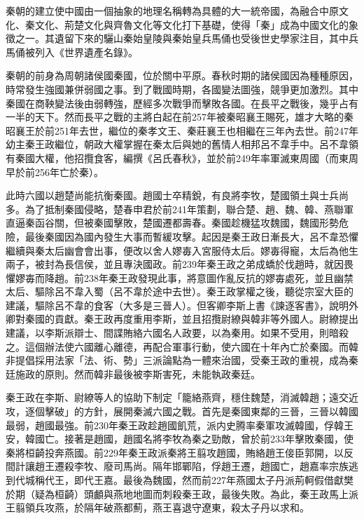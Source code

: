 秦朝的建立使中國由一個抽象的地理名稱轉為具體的大一統帝國，為融合中原文化、秦文化、荊楚文化與齊魯文化等文化打下基礎，使得「秦」成為中國文化的象徵之一。其遺留下來的驪山秦始皇陵與秦始皇兵馬俑也受後世史學家注目，其中兵馬俑被列入《世界遺產名錄》。

秦朝的前身為周朝諸侯國秦國，位於關中平原。春秋时期的諸侯國因為種種原因，時常發生強國兼併弱國之事。到了戰國時期，各國變法圖強，競爭更加激烈。其中秦國在商鞅變法後由弱轉強，歷經多次戰爭而擊敗各國。在長平之戰後，幾乎占有一半的天下。然而長平之戰的主將白起在前257年被秦昭襄王賜死，雄才大略的秦昭襄王於前251年去世，繼位的秦孝文王、秦莊襄王也相繼在三年內去世。前247年幼主秦王政繼位，朝政大權掌握在秦太后與她的舊情人相邦呂不韋手中。呂不韋領有秦國大權，他招攬食客，編撰《呂氏春秋》，並於前249年率軍滅東周國（而東周早於前256年亡於秦）。

此時六國以趙楚尚能抗衡秦國。趙國士卒精銳，有良將李牧，楚國領土與士兵尚多。為了抵制秦國侵略，楚春申君於前241年策劃，聯合楚、趙、魏、韓、燕聯軍直逼秦函谷關，但被秦國擊敗，楚國遷都壽春。秦國趁機猛攻魏國，魏國形勢危險，最後秦國因為國內發生大事而暫緩攻擊。起因是秦王政日漸長大，呂不韋恐懼繼續與秦太后幽會會出事，便改以舍人嫪毐入宮服侍太后。嫪毐得寵，太后為他生兩子，被封為長信侯，並且專決國政。前239年秦王政之弟成蟜於伐趙時，就因畏懼嫪毐而降趙。前238年秦王政發現此事，將意圖作亂反抗的嫪毐處死，並且幽禁太后、驅除呂不韋入蜀（呂不韋於途中去世）。秦王政掌權之後，聽從宗室大臣的建議，驅除呂不韋的食客（大多是三晉人）。但客卿李斯上書《諫逐客書》，說明外卿對秦國的貢獻。秦王政再度重用李斯，並且招攬尉繚與韓非等外國人。尉繚提出建議，以李斯派辯士、間諜賄絡六國名人政要，以為秦用。如果不受用，則暗殺之。這個辦法使六國離心離德，再配合軍事行動，使六國在十年內亡於秦國。而韓非提倡採用法家「法、術、勢」三派論點為一體來治國，受秦王政的重視，成為秦廷施政的原則。然而韓非最後被李斯害死，未能執政秦廷。

秦王政在李斯、尉繚等人的協助下制定「籠絡燕齊，穩住魏楚，消滅韓趙；遠交近攻，逐個擊破」的方針，展開秦滅六國之戰。首先是秦國東鄰的三晉，三晉以韓國最弱，趙國最強。前230年秦王政趁趙國飢荒，派内史腾率秦軍攻滅韓國，俘韓王安，韓國亡。接著是趙國，趙國名將李牧為秦之勁敵，曾於前233年擊敗秦國，使秦將桓齮投奔燕國。前229年秦王政派秦將王翦攻趙國，賄絡趙王倿臣郭開，以反間計讓趙王遷殺李牧、廢司馬尚。隔年邯鄲陷，俘趙王遷，趙國亡，趙嘉率宗族逃到代城稱代王，即代王嘉。最後為魏國，然而前227年燕國太子丹派荊軻假借獻樊於期（疑為桓齮）頭顱與燕地地圖而刺殺秦王政，最後失敗。為此，秦王政馬上派王翦領兵攻燕，於隔年破燕都薊，燕王喜退守遼東，殺太子丹以求和。

